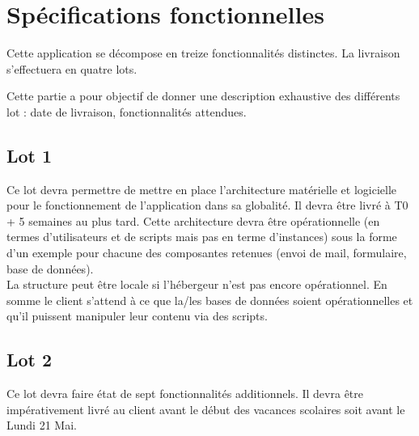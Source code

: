 \section{Spécifications fonctionnelles}
\label{spec_fonct}

Cette application se décompose en treize fonctionnalités distinctes. La livraison s'effectuera en quatre lots.

Cette partie a pour objectif de donner une description exhaustive des différents lot : 
date de livraison, fonctionnalités attendues. 
\\ 

\subsection{Lot 1}


Ce lot devra permettre de mettre en place l'architecture matérielle et logicielle pour le fonctionnement de l'application dans sa globalité.
 Il devra être livré à T0 + 5 semaines au plus tard. Cette architecture devra être opérationnelle (en termes d'utilisateurs et de scripts mais pas en terme d'instances) sous la forme d'un exemple pour chacune des composantes retenues (envoi de mail, formulaire, base de données). 
 \\
 La structure peut être locale si l'hébergeur n'est pas encore opérationnel.
En somme le client s'attend à ce que la/les bases de données soient opérationnelles et qu'il puissent manipuler leur contenu via des scripts.
\\


\subsection{Lot 2}
Ce lot devra faire état de sept fonctionnalités additionnels. Il devra être impérativement livré au client avant le début des vacances scolaires soit avant le Lundi 21 Mai.

